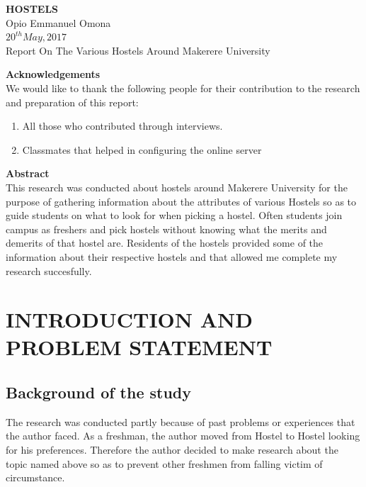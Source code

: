 \documentclass[12pt, a4paper]{article}
\begin{document}
\begin{titlepage}
    \vspace*{\fill}
    \begin{center}
      \Huge{\textbf{HOSTELS}}\\[2cm]
      \Large{Opio Emmanuel Omona}\\[1cm]
      $20^{th} May, 2017$\\[1cm]
      \normalsize {Report On The Various Hostels Around Makerere University}
    \end{center}
    \vspace*{\fill}
\end{titlepage}

\Large{\textbf{Acknowledgements}}\\
\small
We would like to thank the following people for their contribution to the research and preparation of this report:
\begin{enumerate}
\item All those who contributed through interviews.
\item Classmates that helped in configuring the online server\\
\end{enumerate}

\Large{\textbf{Abstract}}\\
\small
This research was conducted about hostels around Makerere University for the purpose of gathering information about the attributes of various Hostels so as to guide students on what to look for when picking a hostel. Often students join campus as freshers and pick hostels without knowing what the merits and demerits of that hostel are. Residents of the hostels provided some of the information about their respective hostels and that allowed me complete my research succesfully.

\tableofcontents
\clearpage
\renewcommand{\theenumi}{\pagenumbering{roman}}
\section{INTRODUCTION AND PROBLEM STATEMENT}

\subsection{Background of the study}
The research was conducted partly because of past problems or experiences that the author faced. As a freshman, the author moved from Hostel to Hostel looking for his preferences. Therefore the author decided to make research about the topic named above so as to prevent other freshmen from falling victim of circumstance.
\end{document}
